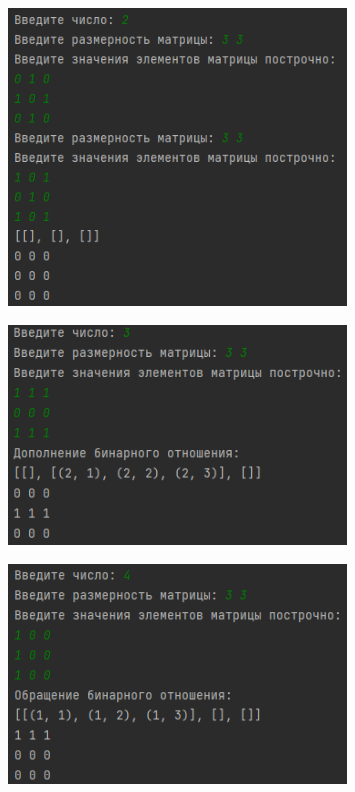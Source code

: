 \documentclass[bachelor, och, labwork]{shiza}
\begin{document}
        \begin{figure}[H]
            \centering
            \includegraphics[width=0.8\textwidth]{pic/4.png}
            \caption{}
        \end{figure}

        \begin{figure}[H]
            \centering
            \includegraphics[width=0.8\textwidth]{pic/5.png}
            \caption{}
        \end{figure}

        \begin{figure}[H]
            \centering
            \includegraphics[width=0.8\textwidth]{pic/6.png}
            \caption{}
        \end{figure}
\end{document}
